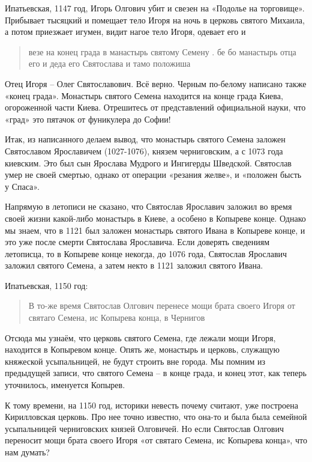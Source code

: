 Ипатьевская, 1147 год, Игорь Олгович убит и свезен на «Подолье на торговище». Прибывает тысяцкий и помещает тело Игоря на ночь в церковь святого Михаила, а потом приезжает игумен, видит нагое тело Игоря, одевает его и 

\begin{quotation}
везе на конец града в манастырь святому 
Семену . бе бо манастырь отца его и деда его Святослава и тамо положиша
\end{quotation}

Отец Игоря – Олег Святославович. Всё верно. Черным по-белому написано также «конец града». Монастырь святого Семена находится на конце града Киева, огороженной части Киева. Отрешитесь от представлений официальной науки, что «град» это пятачок от фуникулера до Софии!

Итак, из написанного делаем вывод, что монастырь святого Семена заложен Святославом Ярославичем (1027-1076), князем черниговским, а с 1073 года киевским. Это был сын Ярослава Мудрого и Ингигерды Шведской. Святослав умер не своей смертью, однако от операции «резания желве», и «положен бысть у Спаса».

Напрямую в летописи не сказано, что Святослав Ярославич заложил во время своей жизни какой-либо монастырь в Киеве, а особено в Копыреве конце. Однако мы знаем, что в 1121 был заложен монастырь святого Ивана в Копыреве конце, и это уже после смерти Святослава Ярославича. Если доверять сведениям летописца, то в Копыреве конце некогда, до 1076 года, Святослав Ярославич заложил святого Семена, а затем некто в 1121 заложил святого Ивана.

Ипатьевская, 1150 год:

\begin{quotation}
В то-же время Святослав Олгович перенесе мощи брата своего Игоря от святаго Семена, ис Копырева конца, в Чернигов 
\end{quotation}

Отсюда мы узнаём, что церковь святого Семена, где лежали мощи Игоря, находится в Копыревом конце. Опять же, монастырь и церковь, служащую княжеской усыпальницей, не будут строить вне города. Мы помним из предыдущей записи, что святого Семена – в конце града, и конец этот, как теперь уточнилось, именуется Копырев.

К тому времени, на 1150 год, историки невесть почему считают, уже построена Кирилловская церковь. Про нее точно известно, что она-то и была была семейной усыпальницей черниговских князей Олговичей. Но если Святослав Олгович переносит мощи брата своего Игоря «от святаго Семена, ис Копырева конца», что нам думать?

